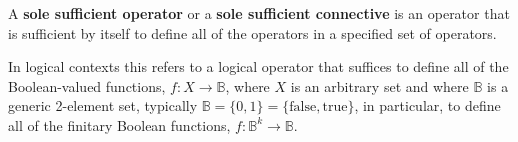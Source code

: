 \documentclass[12pt]{article}
\begin{document}
A \textbf{sole sufficient operator} or a \textbf{sole sufficient connective} is an operator that is sufficient by itself to define all of the operators in a specified set of operators.

In logical contexts this refers to a logical operator that suffices to define all of the Boolean-valued functions, $f : X \to \mathbb{B}$, where $X$ is an arbitrary set and where $\mathbb{B}$ is a generic 2-element set, typically $\mathbb{B} = \{ 0, 1 \} = \{ \mathrm{false}, \mathrm{true} \}$, in particular, to define all of the finitary Boolean functions, $f : \mathbb{B}^k \to \mathbb{B}$.

\end{document}
